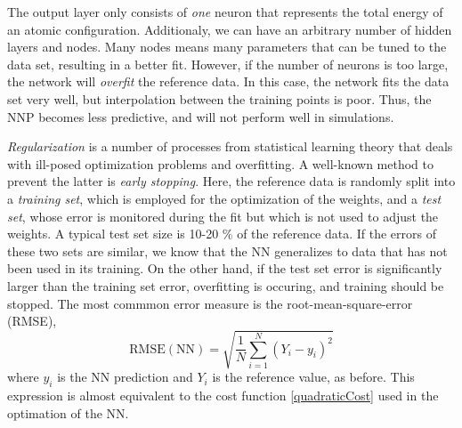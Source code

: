 \documentclass[twoside,english]{uiofysmaster}
\begin{document}
The output layer only consists of \textit{one} neuron that represents the total energy of an atomic 
configuration. Additionaly, we can have an arbitrary number of hidden layers and nodes. 
Many nodes means many parameters that can be tuned to the data set, resulting in a better fit.
However, if the number of neurons is too large, the network will \textit{overfit} the reference data. 
In this case, the network fits the data set very well, but interpolation between the training points is poor. Thus, 
the NNP becomes less predictive, and will not perform well in simulations.

\textit{Regularization} is a number of processes from statistical learning theory that deals with ill-posed optimization
problems and overfitting. A well-known method to prevent the latter is \textit{early stopping}. 
Here, the reference data is randomly split into 
a \textit{training set}, which is employed for the optimization of the weights, and a \textit{test set}, whose error is monitored
during the fit but which is not used to adjust the weights. A typical test set size is 10-20 \% of the reference data.
If the errors of these two sets are similar, we know that the NN
generalizes to data that has not been used in its training. On the other hand, if the test set error is significantly larger
than the training set error, overfitting is occuring, and training should be stopped. The most commmon error measure
is the root-mean-square-error (RMSE), 
\begin{equation}
 \mathrm{RMSE}(\mathrm{NN}) = \sqrt{\frac{1}{N}\sum_{i=1}^N (Y_i - y_i)^2}
\end{equation}
where $y_i$ is the NN prediction and $Y_i$ is the reference value, as before. 
This expression is almost equivalent to the cost function \eqref{quadraticCost} used in the optimation of the NN.
\end{document}
